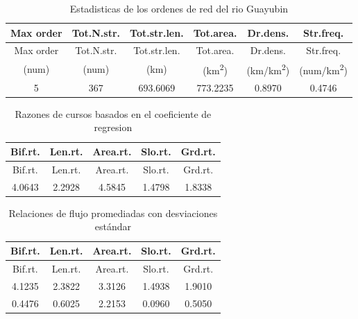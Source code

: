 \documentclass[11pt,]{article}
\begin{document}
\begin{longtable}[]{@{}cccccc@{}}
\caption{\label{tab:estadisticaor} Estadisticas de los ordenes de red
del rio Guayubin}\tabularnewline
\toprule
Max order & Tot.N.str. & Tot.str.len. & Tot.area. & Dr.dens. &
Str.freq.\tabularnewline
\midrule
\endfirsthead
\toprule
Max order & Tot.N.str. & Tot.str.len. & Tot.area. & Dr.dens. &
Str.freq.\tabularnewline
\midrule
\endhead
(num) & (num) & (km) & (km\textsuperscript{2}) &
(km/km\textsuperscript{2}) & (num/km\textsuperscript{2})\tabularnewline
5 & 367 & 693.6069 & 773.2235 & 0.8970 & 0.4746\tabularnewline
\bottomrule
\end{longtable}

\begin{longtable}[]{@{}ccccc@{}}
\caption{\label{tab:regresionc} Razones de cursos basados en el
coeficiente de regresion}\tabularnewline
\toprule
Bif.rt. & Len.rt. & Area.rt. & Slo.rt. & Grd.rt.\tabularnewline
\midrule
\endfirsthead
\toprule
Bif.rt. & Len.rt. & Area.rt. & Slo.rt. & Grd.rt.\tabularnewline
\midrule
\endhead
4.0643 & 2.2928 & 4.5845 & 1.4798 & 1.8338\tabularnewline
\bottomrule
\end{longtable}

\begin{longtable}[]{@{}ccccc@{}}
\caption{\label{estandard} Relaciones de flujo promediadas con
desviaciones estándar}\tabularnewline
\toprule
Bif.rt. & Len.rt. & Area.rt. & Slo.rt. & Grd.rt.\tabularnewline
\midrule
\endfirsthead
\toprule
Bif.rt. & Len.rt. & Area.rt. & Slo.rt. & Grd.rt.\tabularnewline
\midrule
\endhead
4.1235 & 2.3822 & 3.3126 & 1.4938 & 1.9010\tabularnewline
0.4476 & 0.6025 & 2.2153 & 0.0960 & 0.5050\tabularnewline
\bottomrule
\end{longtable}
\end{document}
